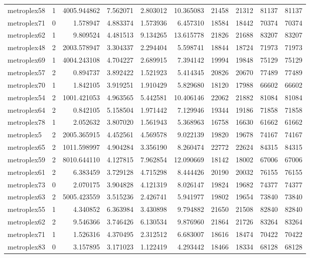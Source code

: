 \begin{longtable}{|l|r|r|r|r|r|r|r|r|r|}
metroplex58 & 1 & 4005.944862 & 7.562071 & 2.803012 & 10.365083 & 21458 & 21312 & 81137 & 81137 \\
metroplex71 & 0 & 1.578947 & 4.883374 & 1.573936 & 6.457310 & 18584 & 18442 & 70374 & 70374 \\
metroplex62 & 1 & 9.809524 & 4.481513 & 9.134265 & 13.615778 & 21826 & 21688 & 83207 & 83207 \\
metroplex48 & 2 & 2003.578947 & 3.304337 & 2.294404 & 5.598741 & 18844 & 18724 & 71973 & 71973 \\
metroplex69 & 1 & 4004.243108 & 4.704227 & 2.689915 & 7.394142 & 19994 & 19848 & 75129 & 75129 \\
metroplex57 & 2 & 0.894737 & 3.892422 & 1.521923 & 5.414345 & 20826 & 20670 & 77489 & 77489 \\
metroplex70 & 1 & 1.842105 & 3.919251 & 1.910429 & 5.829680 & 18120 & 17988 & 66602 & 66602 \\
metroplex54 & 2 & 1001.421053 & 4.963565 & 5.442581 & 10.406146 & 22062 & 21882 & 81084 & 81084 \\
metroplex64 & 2 & 0.842105 & 5.158504 & 1.971442 & 7.129946 & 19344 & 19186 & 71858 & 71858 \\
metroplex78 & 1 & 2.052632 & 3.807020 & 1.561943 & 5.368963 & 16758 & 16630 & 61662 & 61662 \\
metroplex5 & 2 & 2005.365915 & 4.452561 & 4.569578 & 9.022139 & 19820 & 19678 & 74167 & 74167 \\
metroplex65 & 2 & 1011.598997 & 4.904284 & 3.356190 & 8.260474 & 22772 & 22624 & 84315 & 84315 \\
metroplex59 & 2 & 8010.644110 & 4.127815 & 7.962854 & 12.090669 & 18142 & 18002 & 67006 & 67006 \\
metroplex61 & 2 & 6.383459 & 3.729128 & 4.715298 & 8.444426 & 20190 & 20032 & 76155 & 76155 \\
metroplex73 & 0 & 2.070175 & 3.904828 & 4.121319 & 8.026147 & 19824 & 19682 & 74377 & 74377 \\
metroplex63 & 2 & 5005.423559 & 3.515236 & 2.426741 & 5.941977 & 19802 & 19654 & 73840 & 73840 \\
metroplex55 & 1 & 4.340852 & 6.363984 & 3.430898 & 9.794882 & 21650 & 21508 & 82840 & 82840 \\
metroplex62 & 2 & 9.546366 & 3.746426 & 6.130534 & 9.876960 & 21864 & 21726 & 83264 & 83264 \\
metroplex71 & 1 & 1.526316 & 4.370495 & 2.312512 & 6.683007 & 18616 & 18474 & 70422 & 70422 \\
metroplex83 & 0 & 3.157895 & 3.171023 & 1.122419 & 4.293442 & 18466 & 18334 & 68128 & 68128 \\

\end{longtable}
